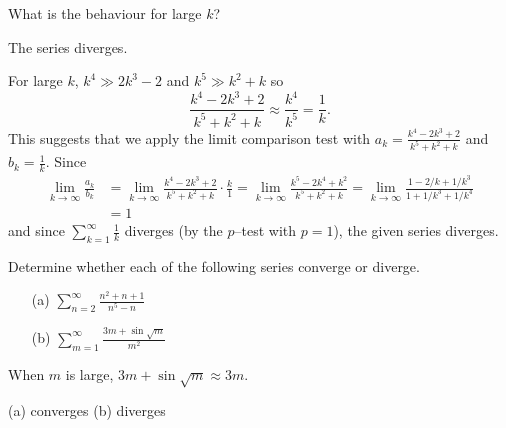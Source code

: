 \begin{hint}
What is the behaviour for large $k$?
\end{hint}

\begin{answer}
The series diverges.
\end{answer}

\begin{solution}
For large $k$, $k^4\gg 2k^3-2$ and $k^5\gg k^2+k$
so \[\frac{k^4-2k^3+2}{k^5+k^2+k}\approx \frac{k^4}{k^5}
=\frac{1}{k}.\]
This suggests that we apply the limit
comparison test with $a_k=\frac{k^4-2k^3+2}{k^5+k^2+k}$ and
$b_k=\frac{1}{k}$.
Since
\begin{align*}
\lim_{k\rightarrow\infty} \frac{a_k}{b_k}
&=\lim_{k\rightarrow\infty} \frac{k^4-2k^3+2}{k^5+k^2+k}\cdot \frac{k}{1}
=\lim_{k\rightarrow\infty} \frac{k^5-2k^4+k^2}{k^5+k^2+k}
=\lim_{k\rightarrow\infty} \frac{1-2/k+1/k^3}{1+1/k^3+1/k^4} \\
&=1
\end{align*}
and since $\sum\limits_{k=1}^\infty\frac{1}{k}$ diverges  (by the $p$--test
with $p=1$), the given series diverges.
\end{solution}


\begin{question}[M105 2015A]
Determine whether each of the following series converge or diverge.

\begin{enumerate}
\item[(a)] $\displaystyle\sum_{n=2}^\infty\frac{n^2+n+1}{n^5-n}$
\item[(b)] $\displaystyle\sum_{m=1}^\infty\frac{3m+\sin\sqrt{m}}{m^2}$
\end{enumerate}
\end{question}

\begin{hint}
When $m$ is large, $3m+\sin\sqrt{m}\approx 3m$.
\end{hint}

\begin{answer}
(a) converges
\qquad (b) diverges
\end{answer}

